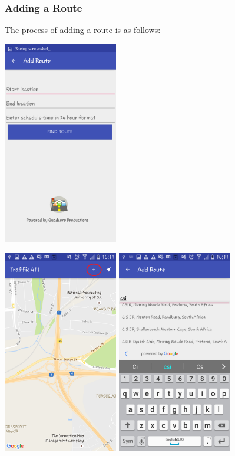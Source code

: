 \documentclass[a4paper,12pt]{article}
\begin{document}
\subsubsection{Adding a Route}
The process of adding a route is as follows:
\begin{center}
\includegraphics[width=50mm, scale=0.5]{images/AddRoute.png}
\end{center}
\begin{center}
\includegraphics[width=50mm, scale=0.5]{images/MainScreen2.png}
\includegraphics[width=50mm, scale=0.5]{images/AddRoute2.png}
\end{center}
\end{document}
